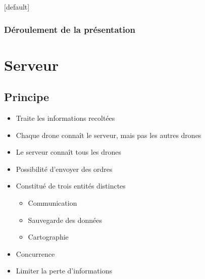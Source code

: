 \documentclass{beamer}
\begin{document}
  {
    \makeatletter
    [default]
    \def\beamer@entrycode{\vspace*{-\headheight}}
    \makeatother
    \begin{frame}
      \frametitle{Déroulement de la présentation}
      \tableofcontents[hidesubsections]
    \end{frame}
  }
  
  {
    \section{Serveur}
      
      \subsection{Principe}
	\begin{frame}
	  \begin{itemize}
	   \item Traite les informations recoltées
	   \item Chaque drone connaît le serveur, mais pas les autres drones
	   \item Le serveur connaît tous les drones
	   \item Possibilité d'envoyer des ordres
	  \end{itemize}
	\end{frame}
      
	\begin{frame}
	  \begin{itemize}
	    \item Constitué de trois entités distinctes
	    \begin{itemize}
	      \item Communication
	      \item Sauvegarde des données
	      \item Cartographie
	    \end{itemize}
	    \item Concurrence
	    \item Limiter la perte d'informations
	  \end{itemize}
	\end{frame}
	
}
\end{document}
